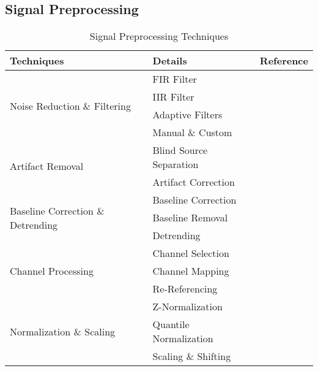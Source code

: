 \subsection{Signal Preprocessing}

\begin{table}[]
\renewcommand{\arraystretch}{1.2}
\caption{Signal Preprocessing Techniques}
\label{tab:lowlevel}
\footnotesize
\centering
\begin{tabular}{p{80pt}p{90pt}p{30pt}}
\hline
\textbf{Techniques}     & \textbf{Details}             & \textbf{Reference}             \\
\hline
\multirow{4}{80pt}{Noise Reduction \& Filtering} 
                            & FIR Filter           & ~\cite{banville2021uncovering}  \\
                            & IIR Filter           & ~\cite{oh2020deep} \\
                            & Adaptive Filters     & ~\cite{9353630}\\
                            & Manual \& Custom     & ~\cite{ay2019automated} \\
\hline
\multirow{2}{80pt}{Artifact Removal} 
                            & Blind Source Separation  & ~\cite{10023506} \\
                            & Artifact Correction  & ~\cite{MOGHADDARI2020105738} \\
\hline
\multirow{3}{80pt}{Baseline Correction \& Detrending} 
                            & Baseline Correction  & ~\cite{sun2021hybrid} \\
                            & Baseline Removal     & ~\cite{nouri2024detection} \\
                            & Detrending           & ~\cite{Seizure49} \\
\hline
\multirow{3}{80pt}{Channel Processing} 
                            & Channel Selection    & ~\cite{wen2018deep} \\
                            & Channel Mapping      & ~\cite{Kostas2021BENDR} \\
                            & Re-Referencing       & ~\cite{nouri2024detection} \\
\hline
\multirow{3}{80pt}{Normalization \& Scaling} 
                            & Z-Normalization      & ~\cite{ACHARYA2018270} \\
                            & Quantile Normalization & ~\cite{ko2022eeg} \\
                            & Scaling \& Shifting  & ~\cite{Kostas2021BENDR} \\

\end{tabular}
\end{table}
